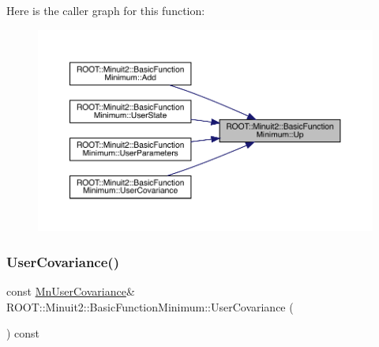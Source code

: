 Here is the caller graph for this function\+:
\nopagebreak
\begin{figure}[H]
\begin{center}
\leavevmode
\includegraphics[width=350pt]{de/d25/classROOT_1_1Minuit2_1_1BasicFunctionMinimum_a576364a872f31ede72df956b103e0d6e_icgraph}
\end{center}
\end{figure}
\mbox{\label{classROOT_1_1Minuit2_1_1BasicFunctionMinimum_a4f06adfe70411becfe7aa48f6bce1f22}} 
\subsubsection{\texorpdfstring{UserCovariance()}{UserCovariance()}\hspace{0.1cm}{\footnotesize\ttfamily [1/3]}}
{\footnotesize\ttfamily const \mbox{\hyperlink{classROOT_1_1Minuit2_1_1MnUserCovariance}{Mn\+User\+Covariance}}\& R\+O\+O\+T\+::\+Minuit2\+::\+Basic\+Function\+Minimum\+::\+User\+Covariance (\begin{DoxyParamCaption}{ }\end{DoxyParamCaption}) const\hspace{0.3cm}{\ttfamily [inline]}}

